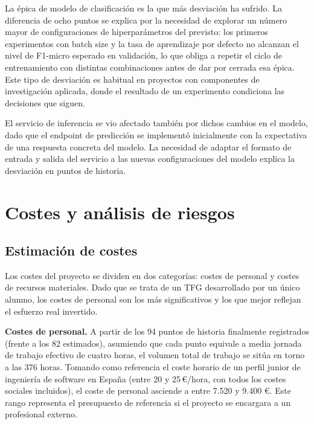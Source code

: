 La épica de modelo de clasificación es la que más desviación ha sufrido. La diferencia de ocho puntos se explica por la necesidad de explorar un número mayor de configuraciones de hiperparámetros del previsto: los primeros experimentos con batch size y la tasa de aprendizaje por defecto no alcanzan el nivel de F1-micro esperado en validación, lo que obliga a repetir el ciclo de entrenamiento con distintas combinaciones antes de dar por cerrada esa épica. Este tipo de desviación es habitual en proyectos con componentes de investigación aplicada, donde el resultado de un experimento condiciona las decisiones que siguen.

El servicio de inferencia se vio afectado también por dichos cambios en el modelo, dado que el endpoint de predicción se implementó inicialmente con la expectativa de una respuesta concreta del modelo. La necesidad de adaptar el formato de entrada y salida del servicio a las nuevas configuraciones del modelo explica la desviación en puntos de historia.

\section{Costes y análisis de riesgos}

\subsection{Estimación de costes}

Los costes del proyecto se dividen en dos categorías: costes de personal y costes de recursos materiales. Dado que se trata de un TFG desarrollado por un único alumno, los costes de personal son los más significativos y los que mejor reflejan el esfuerzo real invertido.

\textbf{Costes de personal.} A partir de los 94 puntos de historia finalmente registrados (frente a los 82 estimados), asumiendo que cada punto equivale a media jornada de trabajo efectivo de cuatro horas, el volumen total de trabajo se sitúa en torno a las 376 horas. Tomando como referencia el coste horario de un perfil junior de ingeniería de software en España (entre 20 y 25\,€/hora, con todos los costes sociales incluidos), el coste de personal asciende a entre 7.520 y 9.400 €. Este rango representa el presupuesto de referencia si el proyecto se encargara a un profesional externo.

